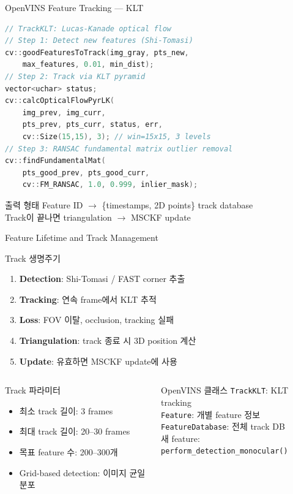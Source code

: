 \begin{frame}[fragile,shrink=10]{OpenVINS Feature Tracking --- KLT}
\begin{lstlisting}[language=C++]
// TrackKLT: Lucas-Kanade optical flow
// Step 1: Detect new features (Shi-Tomasi)
cv::goodFeaturesToTrack(img_gray, pts_new,
    max_features, 0.01, min_dist);
// Step 2: Track via KLT pyramid
vector<uchar> status;
cv::calcOpticalFlowPyrLK(
    img_prev, img_curr,
    pts_prev, pts_curr, status, err,
    cv::Size(15,15), 3); // win=15x15, 3 levels
// Step 3: RANSAC fundamental matrix outlier removal
cv::findFundamentalMat(
    pts_good_prev, pts_good_curr,
    cv::FM_RANSAC, 1.0, 0.999, inlier_mask);
\end{lstlisting}
  \begin{exampleblock}{출력 형태}
    Feature ID $\to$ \{timestamps, 2D points\} track database\\
    Track이 끝나면 triangulation $\to$ MSCKF update
  \end{exampleblock}
\end{frame}


\begin{frame}[shrink=10]{Feature Lifetime and Track Management}
  \begin{block}{Track 생명주기}
    \begin{enumerate}
      \item \textbf{Detection}: Shi-Tomasi / FAST corner 추출
      \item \textbf{Tracking}: 연속 frame에서 KLT 추적
      \item \textbf{Loss}: FOV 이탈, occlusion, tracking 실패
      \item \textbf{Triangulation}: track 종료 시 3D position 계산
      \item \textbf{Update}: 유효하면 MSCKF update에 사용
    \end{enumerate}
  \end{block}
  \begin{columns}[T]
      \begin{block}{Track 파라미터}
        \begin{itemize}
          \item 최소 track 길이: 3 frames
          \item 최대 track 길이: 20--30 frames
          \item 목표 feature 수: 200--300개
          \item Grid-based detection: 이미지 균일 분포
        \end{itemize}
      \end{block}
      \begin{exampleblock}{OpenVINS 클래스}
        \texttt{TrackKLT}: KLT tracking\\
        \texttt{Feature}: 개별 feature 정보\\
        \texttt{FeatureDatabase}: 전체 track DB\\
        새 feature: \texttt{perform\_detection\_monocular()}
      \end{exampleblock}
  \end{columns}
\end{frame}


